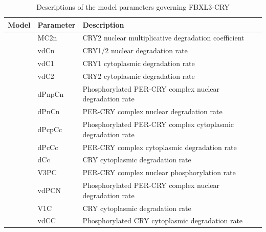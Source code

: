 \begin{table}[p]
\caption{Descriptions of the model parameters governing FBXL3-CRY}
\label{tab:4.1}
\centering
\begin{tabular}{llp{10cm}}\toprule
Model              & Parameter & Description \\\midrule
\cite{Hirota2012}  & MC2n      & CRY2 nuclear multiplicative degradation coefficient \\
                   & vdCn      & CRY1/2 nuclear degradation rate \\
                   & vdC1      & CRY1 cytoplasmic degradation rate \\
                   & vdC2      & CRY2 cytoplasmic degradation rate \\\midrule
\cite{Relogio2011} & dPnpCn    & Phosphorylated PER-CRY complex nuclear degradation rate \\
                   & dPnCn     & PER-CRY complex nuclear degradation rate \\
                   & dPcpCc    & Phosphorylated PER-CRY complex cytoplasmic degradation rate \\
                   & dPcCc     & PER-CRY complex cytoplasmic degradation rate \\
                   & dCc       & CRY cytoplasmic degradation rate \\\midrule
\cite{Leloup2003}  & V3PC      & PER-CRY complex nuclear phosphorylation rate \\
                   & vdPCN     & Phosphorylated PER-CRY complex nuclear degradation rate \\
                   & V1C       & CRY cytoplasmic degradation rate \\
                   & vdCC      & Phosphorylated CRY cytoplasmic degradation rate \\\bottomrule
\end{tabular}
\end{table}

